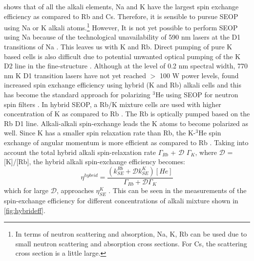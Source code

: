  shows that of all the alkali elements, Na and K have the largest spin exchange efficiency as compared to Rb and Cs. Therefore, it is sensible to pursue SEOP using Na or K alkali atoms.\footnote{In terms of neutron scattering and absorption, Na, K, Rb can be used due to small neutron scattering and absorption cross sections. For Cs, the scattering cross section is a little large.} However, It is not yet possible to perform SEOP using Na because of the technological unavailability of 590 nm lasers at the D1 transitions of Na \cite{Borel2003}. This leaves us with K and Rb. Direct pumping of pure K based cells is also difficult due to potential unwanted optical pumping of the K D2 line in the fine-structure \cite{Chen2007}. Although at the level of 0.2 nm spectral width, 770 nm K D1 transition lasers have not yet reached $>$ 100 W power levels, \cite{Chen2007} found increased spin exchange efficiency using hybrid (K and Rb) alkali cells and this has become the standard approach for polarizing $^3$He using SEOP for neutron spin filters \cite{Chen2007, Chen2011}.  
In hybrid SEOP, a Rb/K mixture cells are used with higher concentration of K as compared to Rb \cite{Lancor2010, Lancor2011}. The Rb is optically pumped based on the Rb D1 line. Alkali-alkali spin-exchange leads the K atoms to become polarized as well. Since K has a smaller spin relaxation rate than Rb, the K-$^3$He spin exchange of angular momentum is more efficient as compared to Rb \cite{Lancor2010, Lancor2011}. Taking into account the total hybrid alkali spin-relaxation rate $\Gamma_{Rb}$ + $ \mathcal{D}$  $ \Gamma_K$, where $ \mathcal{D} $ = [K]/[Rb], the hybrid alkali spin-exchange efficiency becomes:
\begin{equation}
    \eta^{hybrid} = \frac{ (k_{SE}^{Rb} + \mathcal{D} k_{SE}^{K} ) [He]}{\Gamma_{Rb} + \mathcal{D}\Gamma_K}
\end{equation}
which for large $\mathcal{D}$, approaches $\eta_{SE}^{K}$ \cite{Lancor2010, Lancor2011}. This can be seen in the measurements of the spin-exchange efficiency for different concentrations of alkali mixture shown in \cref{fig:hybrideff}.

